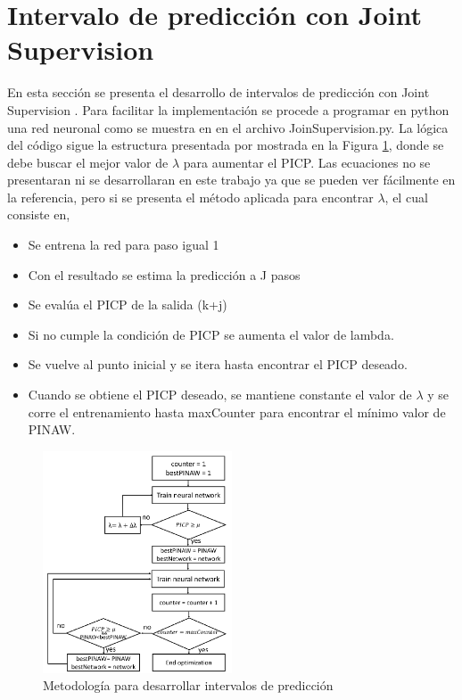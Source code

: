 \documentclass[12pt]{article}
\begin{document}
\section{Intervalo de predicción con Joint Supervision}
En esta sección se presenta el desarrollo de intervalos de predicción con Joint Supervision \cite{cruz_neural_2018}. Para facilitar la implementación se procede a programar en python una red neuronal como se muestra en \cite{git} en el archivo JoinSupervision.py. La lógica del código sigue la estructura presentada por \cite{cruz_neural_2018} mostrada en la Figura \ref{est_js}, donde se debe buscar el mejor valor de $\lambda$ para aumentar el PICP. Las ecuaciones no se presentaran ni se desarrollaran en este trabajo ya que se pueden ver fácilmente en la referencia, pero si se presenta el método aplicada para encontrar $\lambda$, el cual consiste en,
\begin{itemize}
\item Se entrena la red para paso igual 1
\item Con el resultado se estima la predicción a J pasos
\item Se evalúa el PICP de la salida (k+j)
\item Si no cumple la condición de PICP se aumenta el valor de lambda.
\item Se vuelve al punto inicial y se itera hasta encontrar el PICP deseado.
\item Cuando se obtiene el PICP deseado, se mantiene constante el valor de $\lambda$ y se corre el entrenamiento hasta maxCounter para encontrar el mínimo valor de PINAW.
\end{itemize}
\begin{figure}[!h]
	\centering
	\captionsetup{justification=centering}
	 \includegraphics[width=0.5\textwidth]{imag/redes/estructura_js.png}
	\caption{Metodología para desarrollar intervalos de predicción}
	\label{est_js}
\end{figure}
\end{document}
